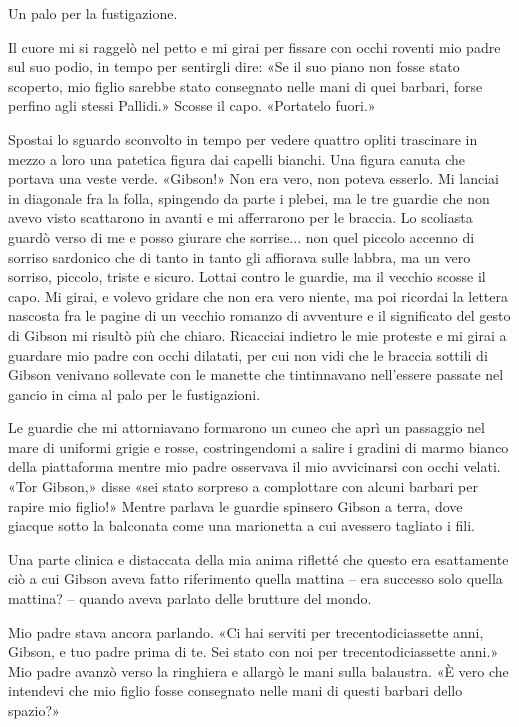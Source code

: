 Un palo per la fustigazione.

Il cuore mi si raggelò nel petto e mi girai per fissare con occhi
roventi mio padre sul suo podio, in tempo per sentirgli dire: «Se il suo
piano non fosse stato scoperto, mio figlio sarebbe stato consegnato
nelle mani di quei barbari, forse perfino agli stessi Pallidi.» Scosse
il capo. «Portatelo fuori.»

Spostai lo sguardo sconvolto in tempo per vedere quattro opliti
trascinare in mezzo a loro una patetica figura dai capelli bianchi. Una
figura canuta che portava una veste verde. «Gibson!» Non era vero, non
poteva esserlo. Mi lanciai in diagonale fra la folla, spingendo da parte
i plebei, ma le tre guardie che non avevo visto scattarono in avanti e
mi afferrarono per le braccia. Lo scoliasta guardò verso di me e posso
giurare che sorrise... non quel piccolo accenno di sorriso sardonico che
di tanto in tanto gli affiorava sulle labbra, ma un vero sorriso,
piccolo, triste e sicuro. Lottai contro le guardie, ma il vecchio scosse
il capo. Mi girai, e volevo gridare che non era vero niente, ma poi
ricordai la lettera nascosta fra le pagine di un vecchio romanzo di
avventure e il significato del gesto di Gibson mi risultò più che
chiaro. Ricacciai indietro le mie proteste e mi girai a guardare mio
padre con occhi dilatati, per cui non vidi che le braccia sottili di
Gibson venivano sollevate con le manette che tintinnavano nell'essere
passate nel gancio in cima al palo per le fustigazioni.

Le guardie che mi attorniavano formarono un cuneo che aprì un passaggio
nel mare di uniformi grigie e rosse, costringendomi a salire i gradini
di marmo bianco della piattaforma mentre mio padre osservava il mio
avvicinarsi con occhi velati. «Tor Gibson,» disse «sei stato sorpreso a
complottare con alcuni barbari per rapire mio figlio!» Mentre parlava le
guardie spinsero Gibson a terra, dove giacque sotto la balconata come
una marionetta a cui avessero tagliato i fili.

Una parte clinica e distaccata della mia anima rifletté che questo era
esattamente ciò a cui Gibson aveva fatto riferimento quella mattina --
era successo solo quella mattina? -- quando aveva parlato delle brutture
del mondo.

Mio padre stava ancora parlando. «Ci hai serviti per trecentodiciassette
anni, Gibson, e tuo padre prima di te. Sei stato con noi per
trecentodiciassette anni.» Mio padre avanzò verso la ringhiera e allargò
le mani sulla balaustra. «È vero che intendevi che mio figlio fosse
consegnato nelle mani di questi barbari dello spazio?»

